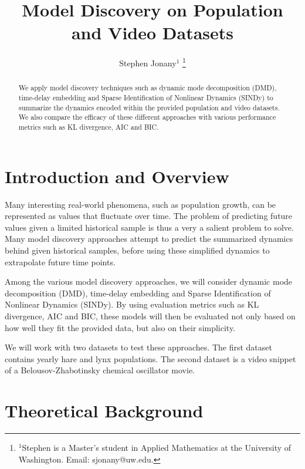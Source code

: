 \documentclass[letterpaper, 10 pt, conference]{ieeeconf}  %
\title{\LARGE \bf
Model Discovery on Population and Video Datasets
}
\author{Stephen Jonany$^{1}$ %
\thanks{$^{1}$Stephen is a Master's student in Applied Mathematics at the 
University of Washington.
Email: sjonany@uw.edu.}%
}
\begin{document}
\maketitle
\thispagestyle{plain}
\pagestyle{plain}


\begin{abstract}
We apply model discovery techniques such as dynamic mode decomposition (DMD), time-delay embedding and Sparse Identification of Nonlinear Dynamics (SINDy) to summarize the dynamics encoded within the provided population and video datasets. We also compare the efficacy of these different approaches with various performance metrics such as KL divergence, AIC and BIC.

\end{abstract}

\section{Introduction and Overview}
Many interesting real-world phenomena, such as population growth, can be represented as values that fluctuate over time. The problem of predicting future values given a limited historical sample is thus a very a salient problem to solve. Many model discovery approaches attempt to predict the summarized dynamics behind given historical samples, before using these simplified dynamics to extrapolate future time points.

Among the various model discovery approaches, we will consider dynamic mode decomposition (DMD)\cite{schmid2010dmd}, time-delay embedding and Sparse Identification of Nonlinear Dynamics (SINDy)\cite{brunton2016sindy}. By using evaluation metrics such as KL divergence, AIC and BIC, these models will then be evaluated not only based on how well they fit the provided data, but also on their simplicity.

We will work with two datasets to test these approaches. The first dataset contains yearly hare and lynx populations. The second dataset is a video snippet of a Belousov-Zhabotinsky chemical oscillator movie.

\section{Theoretical Background}
\end{document}

